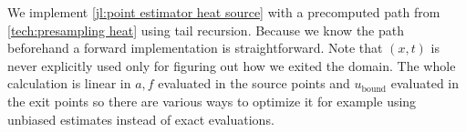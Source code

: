 \documentclass[a4paper,12pt]{article}
\begin{document}
\begin{julia}\label{jl:path point estimator heat source}
  We implement \ref{jl:point estimator heat source} with a precomputed path from \ref{tech:presampling heat} using tail
  recursion. Because we know the path beforehand a forward implementation is straightforward. Note that $(x,t)$ is
  never explicitly used only for figuring out how we exited the domain. The whole calculation is linear in
  $a,f$ evaluated in the source points and $u_\text{bound}$ evaluated in the exit points so there are various
  ways to optimize it for example using unbiased estimates instead of exact evaluations.

\end{julia}










\end{document}
